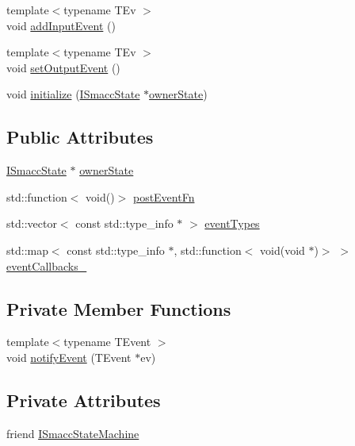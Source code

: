 \begin{DoxyCompactItemize}
\item 
{\footnotesize template$<$typename T\+Ev $>$ }\\void \hyperlink{classsmacc_1_1StateReactor_acd4b35b4c82241fc27bb858761f6e4de}{add\+Input\+Event} ()
\item 
{\footnotesize template$<$typename T\+Ev $>$ }\\void \hyperlink{classsmacc_1_1StateReactor_ae9d0dd0c8cdcc57f8881f0962040c8ed}{set\+Output\+Event} ()
\item 
void \hyperlink{classsmacc_1_1StateReactor_a5c1d734e3a495fa0f2b01229a3dbac3f}{initialize} (\hyperlink{classsmacc_1_1ISmaccState}{I\+Smacc\+State} $\ast$\hyperlink{classsmacc_1_1StateReactor_aabd30af9412a8fea9ec5906f173d9d4a}{owner\+State})
\end{DoxyCompactItemize}
\subsection*{Public Attributes}
\begin{DoxyCompactItemize}
\item 
\hyperlink{classsmacc_1_1ISmaccState}{I\+Smacc\+State} $\ast$ \hyperlink{classsmacc_1_1StateReactor_aabd30af9412a8fea9ec5906f173d9d4a}{owner\+State}
\item 
std\+::function$<$ void()$>$ \hyperlink{classsmacc_1_1StateReactor_a1d97ae5c1689b6716c60c19c94a7eeae}{post\+Event\+Fn}
\item 
std\+::vector$<$ const std\+::type\+\_\+info $\ast$ $>$ \hyperlink{classsmacc_1_1StateReactor_a65c8ddfce40e7859e5c73fff1cf6c04b}{event\+Types}
\item 
std\+::map$<$ const std\+::type\+\_\+info $\ast$, std\+::function$<$ void(void $\ast$)$>$ $>$ \hyperlink{classsmacc_1_1StateReactor_a63cce05c412f3699cc1b15af9aeaf8af}{event\+Callbacks\+\_\+}
\end{DoxyCompactItemize}
\subsection*{Private Member Functions}
\begin{DoxyCompactItemize}
\item 
{\footnotesize template$<$typename T\+Event $>$ }\\void \hyperlink{classsmacc_1_1StateReactor_a9e1b551ab97d1c18b2e1bb60a60455da}{notify\+Event} (T\+Event $\ast$ev)
\end{DoxyCompactItemize}
\subsection*{Private Attributes}
\begin{DoxyCompactItemize}
\item 
friend \hyperlink{classsmacc_1_1StateReactor_ad488bca73fa841277318d8b94c3a9421}{I\+Smacc\+State\+Machine}
\end{DoxyCompactItemize}


